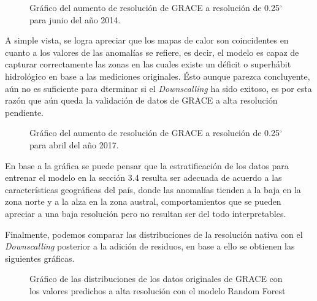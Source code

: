 \begin{figure}[H]
    \centering
          \goodgap
          \vskip -0.1in
    \caption[\textit{Downscalling} final para el mes 06/2014]{Gráfico del aumento de resolución de GRACE a resolución de 0.25$^{\circ}$ para junio del año 2014.}
    \label{dsf14}
\end{figure}

A simple vista, se logra apreciar que los mapas de calor son coincidentes en cuanto a los valores de las anomalías se refiere, es decir, el modelo es capaz de capturar correctamente
las zonas en las cuales existe un déficit o superhábit hidrológico en base a las mediciones originales. Ésto aunque parezca concluyente, aún no es suficiente para dterminar si el \textit{Downscalling}
ha sido exitoso, es por esta razón que aún queda la validación de datos de GRACE a alta resolución pendiente.

\begin{figure}[H]
    \centering
          \goodgap
          \vskip -0.1in
    \caption[\textit{Downscalling} final para el mes 06/2014]{Gráfico del aumento de resolución de GRACE a resolución de 0.25$^{\circ}$ para abril del año 2017.}
    \label{dsf17}
\end{figure}



En base a la gráfica se puede pensar que la estratificación de los datos para entrenar el modelo en la sección 3.4 resulta ser adecuada de acuerdo a las características geográficas del país, donde las anomalías
tienden a la baja en la zona norte y a la alza en la zona austral, comportamientos que se pueden apreciar a una baja resolución pero no resultan ser del todo interpretables.

Finalmente, podemos comparar las distribuciones de la resolución nativa con el \textit{Downscalling} posterior a la adición de residuos, en base a ello se obtienen las siguientes gráficas.
\begin{figure}[H]
    \centering
          \goodgap
          \vskip -0.1in
    \caption[Comparativa de distribuciones de GRACE]{Gráfico de las distribuciones de los datos originales de GRACE con los valores predichos a alta resolución con el modelo Random Forest}
    \label{distcomp}
\end{figure}

